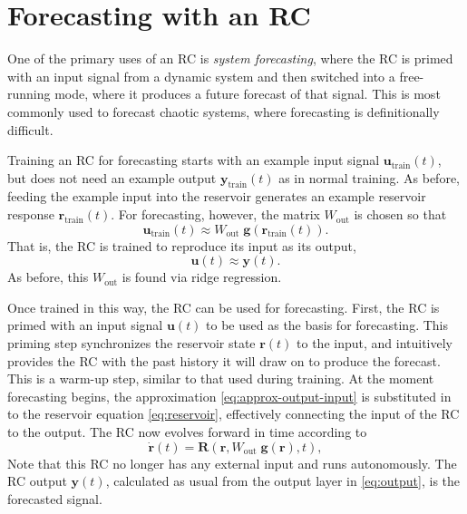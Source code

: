 \section{Forecasting with an RC}\label{sec:forecasting}

One of the primary uses of an RC is \emph{system forecasting}, where
the RC is primed with an input signal from a dynamic system and then
switched into a free-running mode, where it produces a future forecast
of that signal. This is most commonly used to forecast
chaotic systems, where forecasting is definitionally difficult.

Training an RC for forecasting starts with an example input signal
$\bm{u}_\text{train}(t)$, but does not need an example output
$\bm{y}_\text{train}(t)$ as in normal training. As before, feeding the
example input into the reservoir generates an example reservoir
response $\bm{r}_\text{train}(t)$. For forecasting, however, the matrix
$W_\text{out}$ is chosen so that
\begin{equation}
  \label{eq:approx-output-forecast}
  \mathbf{u}_\text{train}(t) \approx W_\text{out}\;\mathbf{g}\left(\mathbf{r}_\text{train}(t)\right).
\end{equation}
That is, the RC is trained to reproduce its input as its output,
\begin{equation}
  \label{eq:approx-output-input}
  \bm{u}(t) \approx \bm{y}(t).
\end{equation}
As before, this $W_\text{out}$ is found via ridge regression.

Once trained in this way, the RC can be used for forecasting. First,
the RC is primed with an input signal $\bm{u}(t)$ to be used as the
basis for forecasting. This priming step synchronizes the reservoir
state $\bm{r}(t)$ to the input, and intuitively provides the RC with
the past history it will draw on to produce the forecast. This is a
warm-up step, similar to that used during training. At the moment
forecasting begins, the approximation \cref{eq:approx-output-input} is
substituted in to the reservoir equation \cref{eq:reservoir},
effectively connecting the input of the RC to the output. The RC now
evolves forward in time according to
\begin{equation}
  \label{eq:reservoir-auto}
  \dot{\mathbf{r}}(t) = \mathbf{R}\left(\mathbf{r}, W_\text{out}\;\bm{g}(\bm{r}), t\right),
\end{equation}
Note that this RC no longer has any external input and runs
autonomously. The RC output $\bm{y}(t)$, calculated as usual from the
output layer in \cref{eq:output}, is the forecasted signal.

